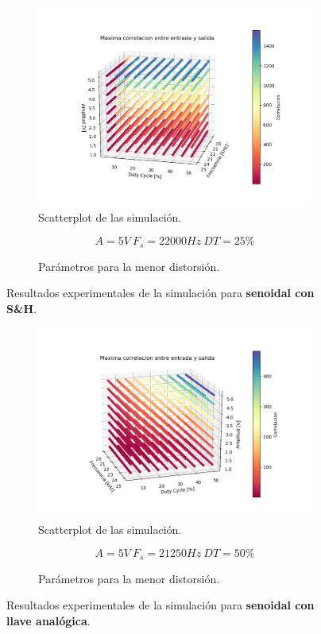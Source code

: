 \begin{figure}[H]
\centering
\begin{subfigure}{\linewidth}
\includegraphics[width=\linewidth]{ImagenesEjercicio6/scatter_sh_seno.png}
\caption{Scatterplot de las simulación.}
\end{subfigure}

\begin{subfigure}{\linewidth}
\[A = 5V \ F_s = 22000Hz \ DT = 25\%\]
\caption{Parámetros para la menor distorsión.}
\end{subfigure}
\label{seno_sh}
\caption{Resultados experimentales de la simulación para \textbf{senoidal con S\&H}.}
\end{figure}

\begin{figure}[H]
\centering
\begin{subfigure}{\linewidth}
\includegraphics[width=\linewidth]{ImagenesEjercicio6/scatter_llave_seno.png}
\caption{Scatterplot de las simulación.}
\end{subfigure}

\begin{subfigure}{\linewidth}
\[A = 5V \ F_s = 21250Hz \ DT = 50\%\]
\caption{Parámetros para la menor distorsión.}
\end{subfigure}
\label{seno_llave}
\caption{Resultados experimentales de la simulación para \textbf{senoidal con llave analógica}.}
\end{figure}

